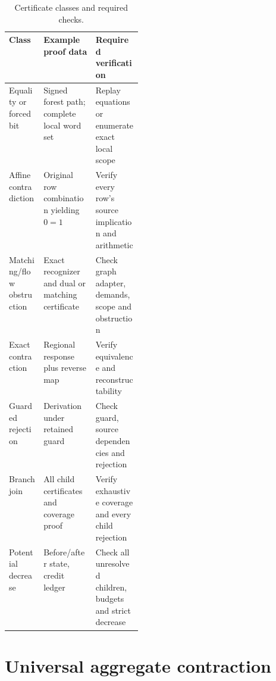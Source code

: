 \documentclass[11pt,letterpaper]{article}
\theoremstyle{definition}
\begin{document}
\begin{table}[htbp]
\centering\small
\caption{Certificate classes and required checks.}\label{tab:certs}
\begin{tabularx}{\linewidth}{@{}L{0.26\linewidth}YY@{}}
\toprule
Class & Example proof data & Required verification \\
\midrule
Equality or forced bit & Signed forest path; complete local word set & Replay equations or enumerate exact local scope \\
Affine contradiction & Original row combination yielding $0=1$ & Verify every row's source implication and arithmetic \\
Matching/flow obstruction & Exact recognizer and dual or matching certificate & Check graph adapter, demands, scope and obstruction \\
Exact contraction & Regional response plus reverse map & Verify equivalence and reconstructability \\
Guarded rejection & Derivation under retained guard & Check guard, source dependencies and rejection \\
Branch join & All child certificates and coverage proof & Verify exhaustive coverage and every child rejection \\
Potential decrease & Before/after state, credit ledger & Check all unresolved children, budgets and strict decrease \\
\bottomrule
\end{tabularx}
\end{table}

\section{Universal aggregate contraction}\label{sec:potential}
\end{document}
